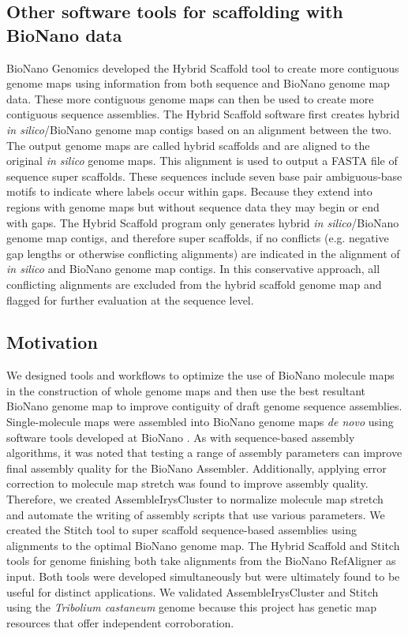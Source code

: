 \documentclass{bmcart}
\begin{document}
\subsection*{Other software tools for scaffolding with BioNano data}
BioNano Genomics developed the Hybrid Scaffold tool to create more contiguous genome maps using information from both sequence and BioNano genome map data. These more contiguous genome maps can then be used to create more contiguous sequence assemblies. The Hybrid Scaffold software first creates hybrid \textit{in silico}/BioNano genome map contigs based on an alignment between the two. The output genome maps are called hybrid scaffolds and are aligned to the original \textit{in silico} genome maps. This alignment is used to output a FASTA file of sequence super scaffolds. These sequences include seven base pair ambiguous-base motifs to indicate where labels occur within gaps. Because they extend into regions with genome maps but without sequence data they may begin or end with gaps. The Hybrid Scaffold program only generates hybrid \textit{in silico}/BioNano genome map contigs, and therefore super scaffolds, if no conflicts (e.g. negative gap lengths or otherwise conflicting alignments) are indicated in the alignment of \textit{in silico} and BioNano genome map contigs. In this conservative approach, all conflicting alignments are excluded from the hybrid scaffold genome map and flagged for further evaluation at the sequence level.

\subsection*{Motivation}
We designed tools and workflows to optimize the use of BioNano molecule maps in the construction of whole genome maps and then use the best resultant BioNano genome map to improve contiguity of draft genome sequence assemblies. Single-molecule maps were assembled into BioNano genome maps \textit{de novo} using software tools developed at BioNano \cite{BioNanoSV2014}. As with sequence-based assembly algorithms, it was noted that testing a range of assembly parameters can improve final assembly quality for the BioNano Assembler. Additionally, applying error correction to molecule map stretch was found to improve assembly quality. Therefore, we created AssembleIrysCluster to normalize molecule map stretch and automate the writing of assembly scripts that use various parameters. We created the Stitch tool to super scaffold sequence-based assemblies using alignments to the optimal BioNano genome map. The Hybrid Scaffold and Stitch tools for genome finishing both take alignments from the BioNano RefAligner as input. Both tools were developed simultaneously but were ultimately found to be useful for distinct applications. We validated AssembleIrysCluster and Stitch using the \textit{Tribolium castaneum} genome \cite{Beetle2008} because this project has genetic map resources \cite{BeetleGenMap2005} that offer independent corroboration.
\end{document}
